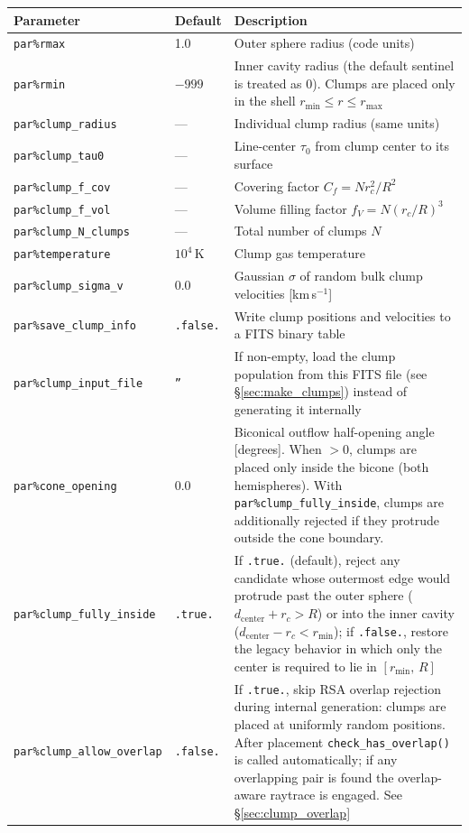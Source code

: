 \documentclass[english,a4paper]{my_memo}
\newcommand{\parm}[1]{\texttt{par\%#1}}
\begin{document}
\begin{center}
\begin{tabular}{@{}l@{\hspace{1.5em}}l@{\hspace{1.5em}}p{8cm}@{}}
\toprule
Parameter & Default & Description \\
\midrule
\parm{rmax}            & 1.0  & Outer sphere radius (code units) \\
\parm{rmin}            & $-999$ & Inner cavity radius (the default sentinel is treated as 0). Clumps are placed only in the shell $r_\text{min} \le r \le r_\text{max}$ \\
\parm{clump\_radius}   & ---  & Individual clump radius (same units) \\
\parm{clump\_tau0}     & ---  & Line-center $\tau_0$ from clump center to its surface \\
\parm{clump\_f\_cov}   & ---  & Covering factor $C_f = N r_c^2 / R^2$ \\
\parm{clump\_f\_vol}   & ---  & Volume filling factor $f_V = N(r_c/R)^3$ \\
\parm{clump\_N\_clumps} & --- & Total number of clumps $N$ \\
\parm{temperature}     & $10^4$\,K & Clump gas temperature \\
\parm{clump\_sigma\_v} & 0.0  & Gaussian $\sigma$ of random bulk clump velocities [km\,s$^{-1}$] \\
\parm{save\_clump\_info} & \texttt{.false.} & Write clump positions and velocities to a FITS binary table \\
\parm{clump\_input\_file}& \texttt{''} & If non-empty, load the clump population from this FITS file (see \S\ref{sec:make_clumps}) instead of generating it internally \\
\parm{cone\_opening}    & 0.0  & Biconical outflow half-opening angle [degrees]. When $>0$, clumps are placed only inside the bicone (both hemispheres). With \parm{clump\_fully\_inside}, clumps are additionally rejected if they protrude outside the cone boundary. \\
\parm{clump\_fully\_inside} & \texttt{.true.} & If \texttt{.true.} (default), reject any candidate whose outermost edge would protrude past the outer sphere ($d_\text{center} + r_c > R$) or into the inner cavity ($d_\text{center} - r_c < r_\text{min}$); if \texttt{.false.}, restore the legacy behavior in which only the center is required to lie in $[r_\text{min},\,R]$ \\
\parm{clump\_allow\_overlap} & \texttt{.false.} & If \texttt{.true.}, skip RSA overlap rejection during internal generation: clumps are placed at uniformly random positions.  After placement \texttt{check\_has\_overlap()} is called automatically; if any overlapping pair is found the overlap-aware raytrace is engaged.  See \S\ref{sec:clump_overlap} \\
\bottomrule
\end{tabular}
\end{center}
\end{document}
